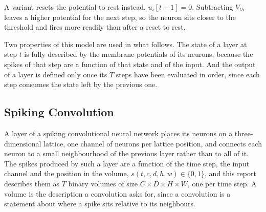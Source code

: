 A variant resets the potential to rest instead, $u_i[t+1]=0$. Subtracting
$V_{th}$ leaves a higher potential for the next step, so the neuron sits closer
to the threshold and fires more readily than after a reset to rest.

Two properties of this model are used in what follows. The state of a layer at
step $t$ is fully described by the membrane potentials of its neurons, because
the spikes of that step are a function of that state and of the input. And the
output of a layer is defined only once its $T$ steps have been evaluated in
order, since each step consumes the state left by the previous one.

\subsection{Spiking Convolution}
\label{sec:1-conv}


A layer of a spiking convolutional neural network places its neurons on a
three-dimensional lattice, one channel of neurons per lattice position, and
connects each neuron to a small neighbourhood of the previous layer rather than
to all of it. The spikes produced by such a layer are a function of the time
step, the input channel and the position in the volume,
$s(t,c,d,h,w)\in\{0,1\}$, and this report describes them as $T$ binary volumes
of size $C\times D\times H\times W$, one per time step. A volume is the
description a convolution asks for, since a convolution is a statement about
where a spike sits relative to its neighbours.

